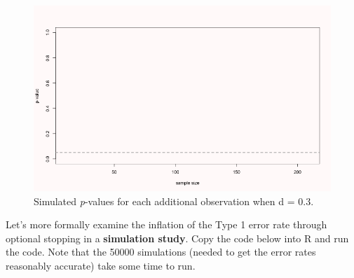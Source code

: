 \documentclass[
  oneside]{book}
\begin{document}
\begin{figure}

{\centering \includegraphics[width=1\linewidth]{images/animatep2} 

}

\caption{Simulated \emph{p}-values for each additional observation when d = 0.3.}\label{fig:animatep2}
\end{figure}

Let's more formally examine the inflation of the Type 1 error rate through optional stopping in a \textbf{simulation study}. Copy the code below into R and run the code. Note that the 50000 simulations (needed to get the error rates reasonably accurate) take some time to run.
\end{document}
